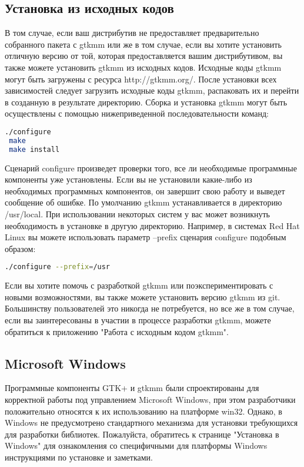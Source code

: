 \subsection{Установка из исходных кодов}

 В том случае, если ваш дистрибутив не предоставляет предварительно собранного пакета с gtkmm или же в том случае, если вы хотите установить отличную версию от той, которая предоставляется вашим дистрибутивом, вы также можете установить gtkmm из исходных кодов. Исходные коды gtkmm могут быть загружены с ресурса http://gtkmm.org/.
После установки всех зависимостей следует загрузить исходные коды gtkmm, распаковать их и перейти в созданную в результате директорию. Сборка и установка gtkmm могут быть осуществлены с помощью нижеприведенной последовательности команд: 
\begin{lstlisting}[language=bash]
./configure
 make
 make install
\end{lstlisting}  
 Сценарий configure произведет проверки того, все ли необходимые программные компоненты уже установлены. Если вы не установили какие-либо из необходимых программных компонентов, он завершит свою работу и выведет сообщение об ошибке.
По умолчанию gtkmm устанавливается в директорию /usr/local. При использовании некоторых систем у вас может возникнуть необходимость в установке в другую директорию. Например, в системах Red Hat Linux вы можете использовать параметр --prefix сценария configure подобным образом: 
\begin{lstlisting}[language=bash]
./configure --prefix=/usr
\end{lstlisting}

Если вы хотите помочь с разработкой gtkmm или поэкспериментировать с новыми возможностями, вы также можете установить версию gtkmm из git. Большинству пользователей это никогда не потребуется, но все же в том случае, если вы заинтересованы в участии в процессе разработки gtkmm, можете обратиться к приложению "Работа с исходным кодом gtkmm". 
\subsection{Microsoft Windows}
 Программные компоненты GTK+ и gtkmm были спроектированы для корректной работы под управлением Microsoft Windows, при этом разработчики положительно относятся к их использованию на платформе win32. Однако, в Windows не предусмотрено стандартного механизма для установки требующихся для разработки библиотек. Пожалуйста, обратитесь к странице "Установка в Windows" для ознакомления со специфичными для платформы Windows инструкциями по установке и заметками.


